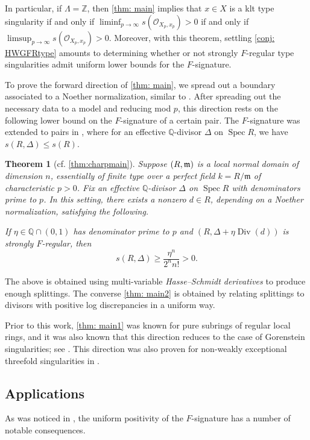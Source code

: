 \documentclass[11pt,leqno]{amsart}
\numberwithin{equation}{section}
\newtheorem{theorem}{Theorem}[section]
\theoremstyle{definition}
\theoremstyle{remark}
\renewcommand{\O}{\mathcal{O}}
\newcommand{\Q}{\mathbb{Q}}
\newcommand{\Z}{\mathbb{Z}}
\newcommand{\Spec}{\operatorname{Spec}}
\newcommand{\Div}{\operatorname{Div}}
\providecommand{\frm}{}
\renewcommand{\frm}{\mathfrak{m}}
\begin{document}
In particular, if $\Lambda = \Z$, then \cref{thm: main} implies that $x \in X$ is a klt type singularity if and only if $\liminf_{p \to \infty} s(\O_{X_p, x_p}) > 0$ if and only if $\limsup_{p \to \infty} s(\O_{X_p, x_p}) > 0$. Moreover, with this theorem, settling \cref{conj: HWGFRtype} amounts to determining whether or not strongly $F$-regular type singularities admit uniform lower bounds for the $F$-signature. 




To prove the forward direction of \cref{thm: main}, we spread out a boundary associated to a Noether normalization, similar to \cite[Proposition 6.4]{bgo17}. After spreading out the necessary data to a model and reducing mod $p$, this direction rests on the following lower bound on the $F$-signature of a certain pair. The $F$-signature was extended to pairs in \cite{bst12}, where for an effective $\Q$-divisor $\Delta$ on $\Spec R$, we have $s(R, \Delta) \leq s(R)$.

\begin{theorem}[{cf. \cref{thm:charpmain}}]
    Suppose $(R, \frak{m})$ is a local normal domain of dimension $n$, essentially of finite type over a perfect field $k = R/\frm$ of characteristic $p > 0$. Fix an effective $\Q$-divisor $\Delta$ on $\Spec R$ with denominators prime to $p$. In this setting, there exists a nonzero $d \in R$, depending on a Noether normalization, satisfying the following. 
    
    If $\eta \in \Q\cap (0,1)$ has denominator prime to $p$ and $(R, \Delta + \eta \Div(d))$ is strongly $F$-regular, then $$s(R, \Delta) \geq \frac{\eta^n}{2^n n!} > 0.$$
\end{theorem}

The above is obtained using multi-variable \textit{Hasse--Schmidt derivatives} to produce enough splittings. The converse \cref{thm: main2} is obtained by relating splittings to divisors with positive log discrepancies in a uniform way. 


Prior to this work, \cref{thm: main1} was known for pure subrings of regular local rings, and it was also known that this direction reduces to the case of Gorenstein singularities; see \cite[Corollary 1.4]{TY25}. This direction was also proven for non-weakly exceptional threefold singularities in \cite[Theorem 1.5]{lp26}. 









\subsection*{Applications} 
As was noticed in \cite{crst18}, the uniform positivity of the $F$-signature has a number of notable consequences. 
\end{document}
